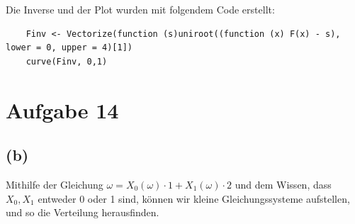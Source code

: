\documentclass[a4paper]{scrartcl}
\begin{document}
Die Inverse und der Plot wurden mit folgendem Code erstellt:\\
\begin{lstlisting}
	Finv <- Vectorize(function (s)uniroot((function (x) F(x) - s), lower = 0, upper = 4)[1])
	curve(Finv, 0,1)
\end{lstlisting}

\newpage

\section*{Aufgabe 14}
\subsection*{(b)}
Mithilfe der Gleichung $\omega = X_0(\omega) \cdot 1 + X_1(\omega)\cdot 2$ und dem Wissen, dass $X_0, X_1$ entweder 0 oder 1 sind, können wir kleine Gleichungssysteme aufstellen, und so die Verteilung herausfinden.\\
\end{document}
